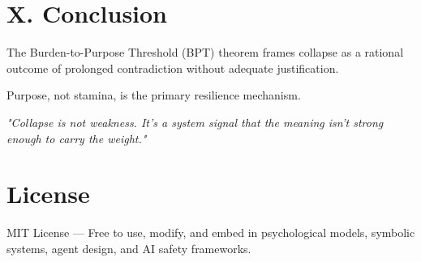 \documentclass[12pt]{article}
\begin{document}
\section*{X. Conclusion}

The Burden-to-Purpose Threshold (BPT) theorem frames collapse as a rational outcome of prolonged contradiction without adequate justification.

Purpose, not stamina, is the primary resilience mechanism.

\textit{"Collapse is not weakness. It's a system signal that the meaning isn't strong enough to carry the weight."}

\section*{License}

MIT License — Free to use, modify, and embed in psychological models, symbolic systems, agent design, and AI safety frameworks.
\end{document}
